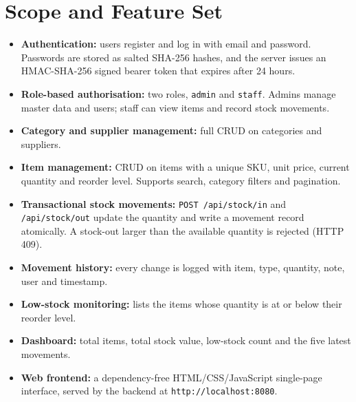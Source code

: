 \documentclass[12pt,a4paper,oneside]{book}
\begin{document}
\section{Scope and Feature Set}
\begin{itemize}
    \item \textbf{Authentication:} users register and log in with email and password.
      Passwords are stored as salted SHA-256 hashes, and the server issues an
      HMAC-SHA-256 signed bearer token that expires after 24 hours.
    \item \textbf{Role-based authorisation:} two roles, \texttt{admin} and \texttt{staff}.
      Admins manage master data and users; staff can view items and record stock movements.
    \item \textbf{Category and supplier management:} full CRUD on categories and suppliers.
    \item \textbf{Item management:} CRUD on items with a unique SKU, unit price, current quantity
      and reorder level. Supports search, category filters and pagination.
    \item \textbf{Transactional stock movements:} \texttt{POST /api/stock/in} and
      \texttt{/api/stock/out} update the quantity and write a movement record atomically.
      A stock-out larger than the available quantity is rejected (HTTP 409).
    \item \textbf{Movement history:} every change is logged with item, type, quantity, note, user and timestamp.
    \item \textbf{Low-stock monitoring:} lists the items whose quantity is at or below their reorder level.
    \item \textbf{Dashboard:} total items, total stock value, low-stock count and the five latest movements.
    \item \textbf{Web frontend:} a dependency-free HTML/CSS/JavaScript single-page interface,
      served by the backend at \texttt{http://localhost:8080}.
\end{itemize}
\end{document}
